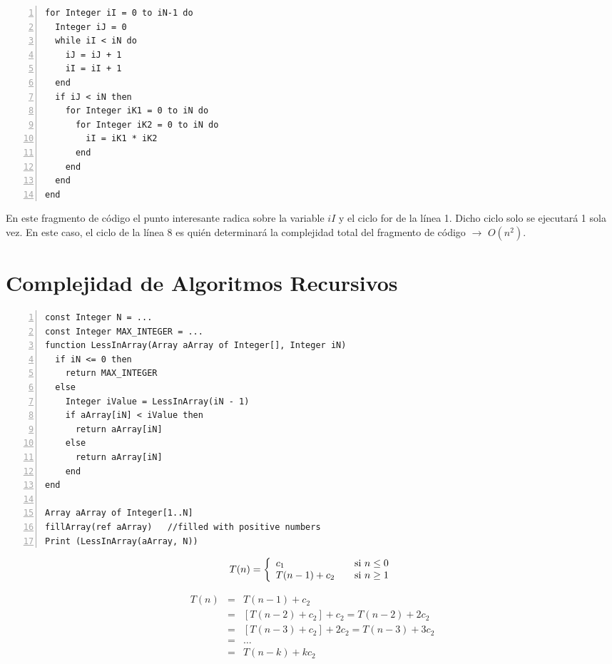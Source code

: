 \begin{lstlisting}[upquote=true, language=pseudo, numbers=left]
for Integer iI = 0 to iN-1 do
  Integer iJ = 0
  while iI < iN do
    iJ = iJ + 1
    iI = iI + 1
  end
  if iJ < iN then
    for Integer iK1 = 0 to iN do
      for Integer iK2 = 0 to iN do
        iI = iK1 * iK2
      end
    end
  end  
end
\end{lstlisting}

En este fragmento de código el punto interesante radica sobre la variable $iI$ y el ciclo for de la línea 1. Dicho ciclo solo se ejecutará 1 sola vez. En este caso, el ciclo de la línea 8 es quién determinará la complejidad total del fragmento de código $\rightarrow$ $O(n^{2})$.

\section{Complejidad de Algoritmos Recursivos}

\begin{lstlisting}[upquote=true, language=pseudo, numbers=left]
const Integer N = ...
const Integer MAX_INTEGER = ...
function LessInArray(Array aArray of Integer[], Integer iN)
  if iN <= 0 then
    return MAX_INTEGER
  else
    Integer iValue = LessInArray(iN - 1)
    if aArray[iN] < iValue then
      return aArray[iN]
    else
      return aArray[iN]
    end
end

Array aArray of Integer[1..N]
fillArray(ref aArray)	//filled with positive numbers
Print (LessInArray(aArray, N))
\end{lstlisting}

\begin{equation}
T(n) = \left\{
  \begin{array}{l l}
    c_1 & \quad \text{si $n \le 0$}\\
    T(n-1) + c_2& \quad \text{si $n \ge 1$}
  \end{array} \right.
 \end{equation}

\begin{eqnarray*}
T(n)&=&T(n-1) + c_2\\
&=&\left [ T(n-2) + c_2\right ] + c_2 = T(n-2) + 2c_2\\
&=&\left [ T(n-3) + c_2\right ] + 2c_2 = T(n-3) + 3c_2\\
&=&\dots\\
&=&T(n-k) + kc_2\\
\end{eqnarray*}

